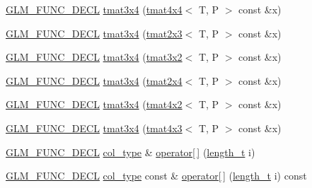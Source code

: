 \begin{DoxyCompactItemize}
\item 
\hyperlink{setup_8hpp_ab2d052de21a70539923e9bcbf6e83a51}{G\+L\+M\+\_\+\+F\+U\+N\+C\+\_\+\+D\+E\+CL} \hyperlink{structglm_1_1detail_1_1tmat3x4_a4cc12711577c849e0106624fc1f3febe}{tmat3x4} (\hyperlink{structglm_1_1detail_1_1tmat4x4}{tmat4x4}$<$ T, P $>$ const \&x)
\item 
\hyperlink{setup_8hpp_ab2d052de21a70539923e9bcbf6e83a51}{G\+L\+M\+\_\+\+F\+U\+N\+C\+\_\+\+D\+E\+CL} \hyperlink{structglm_1_1detail_1_1tmat3x4_a7e69575011350af7e2bed0308f50f0db}{tmat3x4} (\hyperlink{structglm_1_1detail_1_1tmat2x3}{tmat2x3}$<$ T, P $>$ const \&x)
\item 
\hyperlink{setup_8hpp_ab2d052de21a70539923e9bcbf6e83a51}{G\+L\+M\+\_\+\+F\+U\+N\+C\+\_\+\+D\+E\+CL} \hyperlink{structglm_1_1detail_1_1tmat3x4_ab32c639d1270be7cd3b0d6560d6180f2}{tmat3x4} (\hyperlink{structglm_1_1detail_1_1tmat3x2}{tmat3x2}$<$ T, P $>$ const \&x)
\item 
\hyperlink{setup_8hpp_ab2d052de21a70539923e9bcbf6e83a51}{G\+L\+M\+\_\+\+F\+U\+N\+C\+\_\+\+D\+E\+CL} \hyperlink{structglm_1_1detail_1_1tmat3x4_a80b305218294c0d85db5a2fe73712a66}{tmat3x4} (\hyperlink{structglm_1_1detail_1_1tmat2x4}{tmat2x4}$<$ T, P $>$ const \&x)
\item 
\hyperlink{setup_8hpp_ab2d052de21a70539923e9bcbf6e83a51}{G\+L\+M\+\_\+\+F\+U\+N\+C\+\_\+\+D\+E\+CL} \hyperlink{structglm_1_1detail_1_1tmat3x4_aa3747818fd18f9998c5fc79ce434c236}{tmat3x4} (\hyperlink{structglm_1_1detail_1_1tmat4x2}{tmat4x2}$<$ T, P $>$ const \&x)
\item 
\hyperlink{setup_8hpp_ab2d052de21a70539923e9bcbf6e83a51}{G\+L\+M\+\_\+\+F\+U\+N\+C\+\_\+\+D\+E\+CL} \hyperlink{structglm_1_1detail_1_1tmat3x4_abde714d32a6d0da024687e6026f47e55}{tmat3x4} (\hyperlink{structglm_1_1detail_1_1tmat4x3}{tmat4x3}$<$ T, P $>$ const \&x)
\item 
\hyperlink{setup_8hpp_ab2d052de21a70539923e9bcbf6e83a51}{G\+L\+M\+\_\+\+F\+U\+N\+C\+\_\+\+D\+E\+CL} \hyperlink{structglm_1_1detail_1_1tmat3x4_aadea597c799e263c7580c0291753d0de}{col\+\_\+type} \& \hyperlink{structglm_1_1detail_1_1tmat3x4_a787deb7b8f8d3d0f2e1e5df0c6f47bc7}{operator\mbox{[}$\,$\mbox{]}} (\hyperlink{namespaceglm_a090a0de2260835bee80e71a702492ed9}{length\+\_\+t} i)
\item 
\hyperlink{setup_8hpp_ab2d052de21a70539923e9bcbf6e83a51}{G\+L\+M\+\_\+\+F\+U\+N\+C\+\_\+\+D\+E\+CL} \hyperlink{structglm_1_1detail_1_1tmat3x4_aadea597c799e263c7580c0291753d0de}{col\+\_\+type} const  \& \hyperlink{structglm_1_1detail_1_1tmat3x4_a2ff4188b552107abbd7b74a7a58d1802}{operator\mbox{[}$\,$\mbox{]}} (\hyperlink{namespaceglm_a090a0de2260835bee80e71a702492ed9}{length\+\_\+t} i) const

\end{DoxyCompactItemize}
